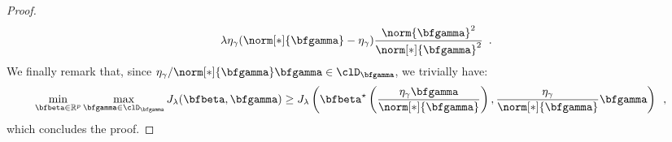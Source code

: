 \begin{proposition}
\begin{proof}
\begin{align*}
           \lambda\eta_\gamma(\norm[*]{\bfgamma}-\eta_\gamma)\frac{\norm{\bfgamma}^2}{\norm[*]{\bfgamma}^2}
         \enspace.
      \end{align*}
      We finally remark that,  
      since ${\eta_\gamma}/{\norm[*]{\bfgamma}}\bfgamma \in \clD_{\bfgamma}$,
      we trivially have:
      \begin{align*}
        \min_{\bfbeta\in\mathbb{R}^{p}} \max_{\bfgamma \in \clD_{\bfgamma}} J_\lambda(\bfbeta,\bfgamma) 
        & \geq 
        J_\lambda\left(\bfbeta^\star\left(\frac{\eta_\gamma \bfgamma}{\norm[*]{\bfgamma}}\right),
                       \frac{\eta_\gamma}{\norm[*]{\bfgamma}}\bfgamma
                 \right)
        \enspace,
      \end{align*}
      which concludes the proof.
    \end{proof}
  \end{proposition}
\fi

